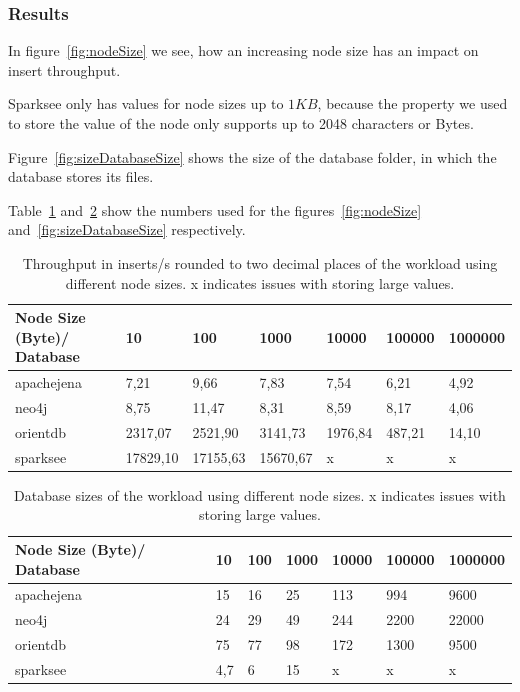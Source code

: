 \subsubsection{Results}
In figure~\ref{fig:nodeSize} we see,
how an increasing node size has an impact on insert throughput.

Sparksee only has values for node sizes up to $ 1KB $,
because the property we used to store the value of the node only supports up to 2048 characters or Bytes.

Figure~\ref{fig:sizeDatabaseSize} shows the size of the database folder,
in which the database stores its files.

Table~\ref{tab:nodeSize} and~\ref{tab:sizeDatabaseSize} show the numbers used for the figures~\ref{fig:nodeSize} and~\ref{fig:sizeDatabaseSize} respectively.

\begin{table}[h!]
  \begin{minipage}{\textwidth}
    \centering
    \begin{tabularx}{\textwidth}{ | X | X | X | X | X | X | X | }
      \hline
      Node Size (Byte)/ \newline
      Database & 10 & 100 & 1000 & 10000 & 100000 & 1000000 \\ \hline
      apachejena & 7,21 & 9,66 & 7,83 & 7,54 & 6,21 & 4,92 \\ \hline
      neo4j & 8,75 & 11,47 & 8,31 & 8,59 & 8,17 & 4,06 \\ \hline
      orientdb & 2317,07 & 2521,90 & 3141,73 & 1976,84 & 487,21 & 14,10 \\ \hline
      sparksee & 17829,10 & 17155,63 & 15670,67 & x & x & x \\ \hline
    \end{tabularx}
  \end{minipage}
  \caption{Throughput in inserts/s rounded to two decimal places of the workload using different node sizes. x indicates issues with storing large values.}
  \label{tab:nodeSize}
\end{table}

\begin{table}[h!]
  \begin{minipage}{\textwidth}
    \centering
    \begin{tabularx}{\textwidth}{ | X | X | X | X | X | X | X | }
      \hline
      Node Size (Byte)/ \newline
      Database & 10 & 100 & 1000 & 10000 & 100000 & 1000000 \\ \hline
      apachejena & 15 & 16 & 25 & 113 & 994 & 9600 \\ \hline
      neo4j & 24 & 29 & 49 & 244 & 2200 & 22000 \\ \hline
      orientdb & 75 & 77 & 98 & 172 & 1300 & 9500 \\ \hline
      sparksee & 4,7 & 6 & 15 & x & x & x \\ \hline
    \end{tabularx}
  \end{minipage}
  \caption{Database sizes of the workload using different node sizes. x indicates issues with storing large values.}
  \label{tab:sizeDatabaseSize}
\end{table}


